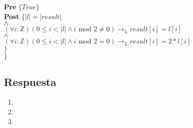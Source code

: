 \documentclass[a4paper]{article}
\begin{document}
\begin{enumerate}[label=\alph*)]
			\hspace*{6mm} \textbf{Pre }$\{ True\}$\smallskip \\
			\hspace*{6mm} \textbf{Post }$\{|l|=|result|$\\
			\hspace*{6mm} $\wedge$\\
			\hspace*{6mm} $(\forall i:\mathbb{Z})(0\leq i <|l|\wedge i \textrm{ mod }2\neq 0)
							\rightarrow_L result[i]=l[i]$\\	
			\hspace*{6mm} $\wedge$\\
			\hspace*{6mm} $(\forall i:\mathbb{Z})(0\leq i <|l|\wedge i \textrm{ mod }2=0)
							\rightarrow_L result[i]=2*l[i]$\\			
			\hspace*{6mm}$\}$\\
			$\}$
	\end{enumerate}
\subsection*{Respuesta}
	\begin{enumerate}[label=\alph*)]
		\item
		\item
		\item
	\end{enumerate}
	
\end{document}
